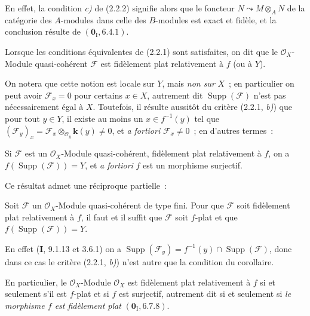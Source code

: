 En effet, la condition \emph{c)} de (2.2.2) signifie alors que le foncteur
$N\leadsto M\otimes_A N$ de la catégorie des $A$-modules dans celle des
$B$-modules est exact et fidèle, et la conclusion résulte de
$(\mathbf{0}_{\mathrm I},6.4.1)$.

\begin{definition}[2.2.4]
\label{IV.2.2.4-fr}
Lorsque les conditions équivalentes de \textup{(2.2.1)} sont satisfaites, on dit que
le $\mathcal O_X$-Module quasi-cohérent $\mathscr F$ est fidèlement plat
relativement à $f$ (ou à $Y$).
\end{definition}

On notera que cette notion est locale sur $Y$, mais \emph{non sur} $X$~; en
particulier on peut avoir $\mathscr F_x=0$ pour certains $x\in X$, autrement
dit $\operatorname{Supp}(\mathscr F)$ n'est pas nécessairement égal à $X$.
Toutefois, il résulte aussitôt du critère (2.2.1, \emph{b)}) que pour tout
$y\in Y$, il existe au moins un $x\in f^{-1}(y)$ tel que
$(\mathscr F_y)_x=\mathscr F_x\otimes_{\mathcal O_y}\boldsymbol{k}(y)\neq0$, et
\emph{a fortiori} $\mathscr F_x\neq0$~; en d'autres termes~:

\begin{corollary}[2.2.5]
\label{IV.2.2.5-fr}
Si $\mathscr F$ est un $\mathcal O_X$-Module quasi-cohérent, fidèlement plat
relativement à $f$, on a $f(\operatorname{Supp}(\mathscr F))=Y$, et
\emph{a fortiori} $f$ est un morphisme surjectif.
\end{corollary}

Ce résultat admet une réciproque partielle~:

\begin{corollary}[2.2.6]
\label{IV.2.2.6-fr}
Soit $\mathscr F$ un $\mathcal O_X$-Module quasi-cohérent de type fini. Pour
que $\mathscr F$ soit fidèlement plat relativement à $f$, il faut et il
suffit que $\mathscr F$ soit $f$-plat et que
$f(\operatorname{Supp}(\mathscr F))=Y$.
\end{corollary}

En effet (\textbf{I}, 9.1.13 et 3.6.1) on a
$\operatorname{Supp}(\mathscr F_y)=f^{-1}(y)\cap\operatorname{Supp}(\mathscr F)$,
donc dans ce cas le critère (2.2.1, \emph{b)}) n'est autre que la condition du
corollaire.

En particulier, le $\mathcal O_X$-Module $\mathcal O_X$ est
fidèlement plat relativement à $f$ si et seulement s'il est $f$-plat et si
$f$ est surjectif, autrement dit si et seulement si \emph{le morphisme $f$
est fidèlement plat} $(\mathbf{0}_{\mathrm I},6.7.8)$.

